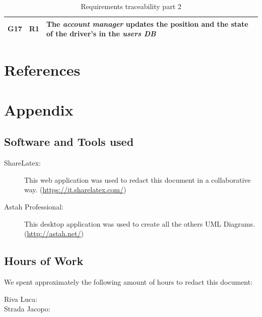 \documentclass[a4paper]{article}
\begin{document}
\begin{table} [H]
\begin{center}
\begin{tabular}{ |M|M|m{\customTableWidth}|  }
    \hline
    \hline

    \textbf{G17} & \textbf{R1} & The \textit{account manager} updates the position and the state of the driver's in the \textit{users DB}\\
    
    \hline


        

\end{tabular}
\end{center}
\label{table:requirementsTraceabilityPt2}
\caption{Requirements traceability part 2}
\end{table}



\section{References}

\section{Appendix}

\subsection{Software and Tools used}

\begin{description}
\item[ShareLatex:] This web application was used to redact this document in a collaborative way. 
\newline (\url{https://it.sharelatex.com/})
\item[Astah Professional:] This desktop application was used to create all the others UML Diagrams.
\newline (\url{http://astah.net/})
\end{description}

\subsection{Hours of Work}
We spent approximately the following amount of hours to redact this document:
\begin{description}
\item[Riva Luca:] 
\item[Strada Jacopo:] 
\end{description}
\end{document}
